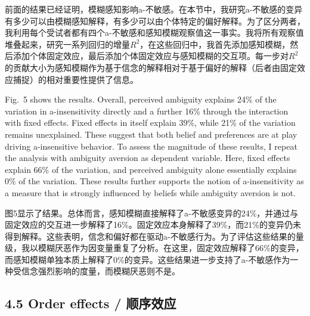 \documentclass[12pt,a4paper]{article}
\newenvironment{original}
  {\par\medskip\noindent\color{black}\ignorespaces}
  {\par\medskip}
\newenvironment{translation}
  {\par\noindent\color{transblue}\ignorespaces}
  {\par\medskip\medskip}
\begin{document}
\begin{translation}
前面的结果已经证明，模糊感知影响a-不敏感。在本节中，我研究a-不敏感的变异有多少可以由模糊感知解释，有多少可以由个体特定的偏好解释。为了区分两者，我利用每个受试者都有四个a-不敏感和感知模糊观察值这一事实。我将所有观察值堆叠起来，研究一系列回归的增量$R^2$，在这些回归中，我首先添加感知模糊，然后添加个体固定效应，最后添加个体固定效应与感知模糊的交互项。每一步对$R^2$的贡献大小为感知模糊作为基于信念的解释相对于基于偏好的解释（后者由固定效应捕捉）的相对重要性提供了信息。
\end{translation}

\begin{original}
Fig.\ 5 shows the results. Overall, perceived ambiguity explains 24\% of the variation in a-insensitivity directly and a further 16\% through the interaction with fixed effects. Fixed effects in itself explain 39\%, while 21\% of the variation remains unexplained. These suggest that both belief and preferences are at play driving a-insensitive behavior. To assess the magnitude of these results, I repeat the analysis with ambiguity aversion as dependent variable. Here, fixed effects explain 66\% of the variation, and perceived ambiguity alone essentially explains 0\% of the variation. These results further supports the notion of a-insensitivity as a measure that is strongly influenced by beliefs while ambiguity aversion is not.
\end{original}

\begin{translation}
图5显示了结果。总体而言，感知模糊直接解释了a-不敏感变异的24\%，并通过与固定效应的交互进一步解释了16\%。固定效应本身解释了39\%，而21\%的变异仍未得到解释。这些表明，信念和偏好都在驱动a-不敏感行为。为了评估这些结果的量级，我以模糊厌恶作为因变量重复了分析。在这里，固定效应解释了66\%的变异，而感知模糊单独本质上解释了0\%的变异。这些结果进一步支持了a-不敏感作为一种受信念强烈影响的度量，而模糊厌恶则不是。
\end{translation}

\subsection{4.5 Order effects / 顺序效应}
\end{document}
